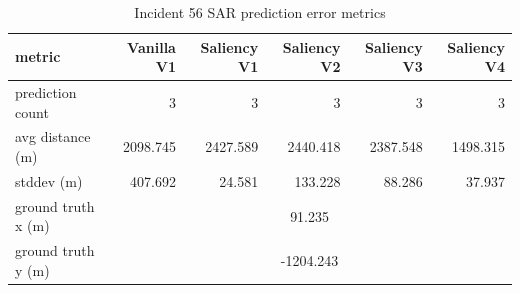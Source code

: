 \begin{table}[ht]
\centering
\caption{Incident 56 SAR prediction error metrics}
\label{tab:sar-incident-56}
\begin{tabular}{lrrrrr}
\hline
metric & Vanilla V1 & Saliency V1 & Saliency V2 & Saliency V3 & Saliency V4 \\
\hline
prediction count & 3 & 3 & 3 & 3 & 3 \\
avg distance (m) & 2098.745 & 2427.589 & 2440.418 & 2387.548 & 1498.315 \\
stddev (m) & 407.692 & 24.581 & 133.228 & 88.286 & 37.937 \\
ground truth x (m) & \multicolumn{5}{c}{91.235} \\
ground truth y (m) & \multicolumn{5}{c}{-1204.243} \\
\hline
\end{tabular}
\end{table}
